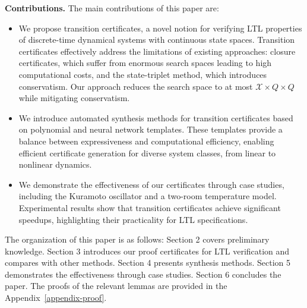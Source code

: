 \textbf{Contributions.} The main contributions of this paper are:
\begin{itemize}
  \item We propose transition certificates, a novel notion for verifying LTL properties of discrete-time dynamical systems with continuous state spaces. Transition certificates effectively address the limitations of existing approaches: closure certificates, which suffer from enormous search spaces leading to high computational costs, and the state-triplet method, which introduces conservatism. Our approach reduces the search space to at most $\mathcal{X} \times Q \times Q$ while mitigating conservatism.
  
  \item We introduce automated synthesis methods​ for transition certificates based on polynomial and neural network templates. These templates provide a balance between expressiveness and computational efficiency, enabling efficient certificate generation for diverse system classes, from linear to nonlinear dynamics.
  
  \item We demonstrate the effectiveness​ of our certificates through case studies, including the Kuramoto oscillator and a two-room temperature model. Experimental results show that transition certificates achieve significant speedups, highlighting their practicality for LTL specifications.
\end{itemize}

The organization of this paper is as follows: Section 2 covers preliminary knowledge. Section 3 introduces our proof certificates for LTL verification and compares with other methods. Section 4 presents synthesis methods. Section 5 demonstrates the effectiveness through case studies. Section 6 concludes the paper. The proofs of the relevant lemmas are provided in the Appendix~\ref{appendix-proof}.



